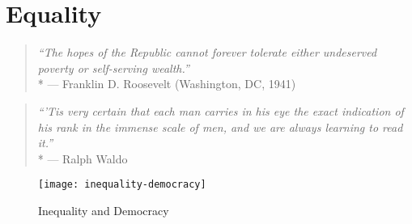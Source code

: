 \section{Equality}

\begin{quote}
	\emph{``The hopes of the Republic cannot forever tolerate either undeserved poverty or self-serving wealth.''}\\*
	--- Franklin D. Roosevelt (Washington, DC, 1941)
\end{quote}

\begin{quote}
	\emph{``'Tis very certain that each man carries in his eye the exact indication of his rank in the immense scale of men, and we are always learning to read it.''}\\*
	--- Ralph Waldo \cite{Emerson1860}
\end{quote}

 \begin{figure}[htbp]
	\centering
	\texttt{[image: inequality-democracy]}  
	\caption{Inequality and Democracy}
	\label{fig:inequality-democracy}
\end{figure} 




